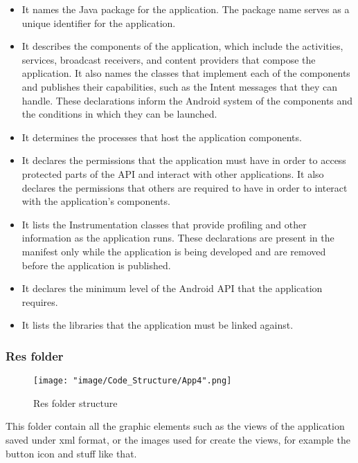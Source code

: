 \begin{itemize}
\item It names the Java package for the application. The package name serves as a unique identifier for the application.

\item It describes the components of the application, which include the activities, services, broadcast receivers, and content providers that compose the application. It also names the classes that implement each of the components and publishes their capabilities, such as the Intent messages that they can handle. These declarations inform the Android system of the components and the conditions in which they can be launched.

\item It determines the processes that host the application components.

\item It declares the permissions that the application must have in order to access protected parts of the API and interact with other applications. It also declares the permissions that others are required to have in order to interact with the application's components.

\item It lists the Instrumentation classes that provide profiling and other information as the application runs. These declarations are present in the manifest only while the application is being developed and are removed before the application is published.

\item It declares the minimum level of the Android API that the application requires.

\item It lists the libraries that the application must be linked against.
\end{itemize}

\subsubsection{Res folder}

\begin{figure}[H]
\begin{center}
\texttt{[image: "image/Code\_Structure/App4".png]}
\caption{Res folder structure}
\end{center}
\end{figure}

This folder contain all the graphic elements such as  the views of the application saved under xml format, or the images used for create the views, for example the button icon and stuff like that.

